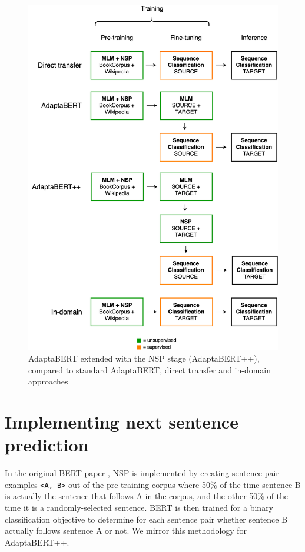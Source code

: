 \begin{figure}
    \centering
    \hspace{-1.5cm}
    \includegraphics[scale=0.28]{0-img/adaptabert-nsp.png}
    \caption{AdaptaBERT extended with the NSP stage (AdaptaBERT++), compared to standard AdaptaBERT, direct transfer and in-domain approaches}
    \label{fig:adaptabert-nsp}
\end{figure}

\section{Implementing next sentence prediction}

In the original BERT paper \cite{bert}, NSP is implemented by creating sentence pair examples \texttt{<A, B>} out of the pre-training corpus where 50\% of the time sentence B is actually the sentence that follows A in the corpus, and the other 50\% of the time it is a randomly-selected sentence. BERT is then trained for a binary classification objective to determine for each sentence pair whether sentence B actually follows sentence A or not. We mirror this methodology for AdaptaBERT++.

